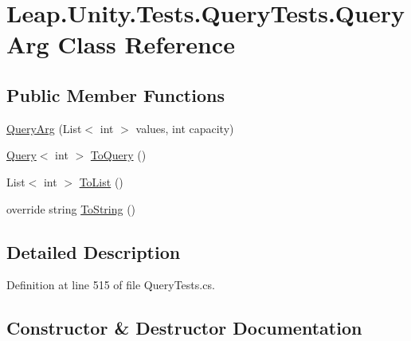 \hypertarget{class_leap_1_1_unity_1_1_tests_1_1_query_tests_1_1_query_arg}{}\section{Leap.\+Unity.\+Tests.\+Query\+Tests.\+Query\+Arg Class Reference}
\label{class_leap_1_1_unity_1_1_tests_1_1_query_tests_1_1_query_arg}
\subsection*{Public Member Functions}
\begin{DoxyCompactItemize}
\item 
\mbox{\hyperlink{class_leap_1_1_unity_1_1_tests_1_1_query_tests_1_1_query_arg_a54345172c89f2fe8e331c487fde69f67}{Query\+Arg}} (List$<$ int $>$ values, int capacity)
\item 
\mbox{\hyperlink{struct_leap_1_1_unity_1_1_query_1_1_query}{Query}}$<$ int $>$ \mbox{\hyperlink{class_leap_1_1_unity_1_1_tests_1_1_query_tests_1_1_query_arg_ab360ee1123e16be93d47af1bd1acd48a}{To\+Query}} ()
\item 
List$<$ int $>$ \mbox{\hyperlink{class_leap_1_1_unity_1_1_tests_1_1_query_tests_1_1_query_arg_aea1ae78b9078dd2239e520e7ce4c8965}{To\+List}} ()
\item 
override string \mbox{\hyperlink{class_leap_1_1_unity_1_1_tests_1_1_query_tests_1_1_query_arg_a2570909fa1bdd4d951f8b470e7542015}{To\+String}} ()
\end{DoxyCompactItemize}


\subsection{Detailed Description}


Definition at line 515 of file Query\+Tests.\+cs.



\subsection{Constructor \& Destructor Documentation}
\mbox{\label{class_leap_1_1_unity_1_1_tests_1_1_query_tests_1_1_query_arg_a54345172c89f2fe8e331c487fde69f67}} 
